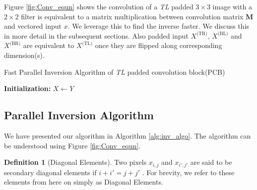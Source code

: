 \documentclass[a4paper,twoside]{article}
\theoremstyle{definition}
\newtheorem{definition}{Definition}
\begin{document}
Figure \ref{fig:Conv_equn} shows the convolution of a \emph{TL} padded $3 \times 3$ image with a $2 \times 2$ filter is equivalent to a matrix multiplication between convolution matrix $\textbf{M}$ and vectored input $x$.  We leverage this to find the inverse faster. We discuss this in more detail in the subsequent sections. Also padded input $X^{\text{(TR)}}$, $X^{\text{(BL)}}$ and $X^{\text{(BR)}}$ are equivalent to $X^{\text{(TL)}}$ once they are flipped along corresponding dimension(s).  



\begin{algorithm}[!t] 
    \caption{Fast Parallel Inversion Algorithm of \emph{TL} padded convolution block(PCB)}
    \label{alg:inv_algo}
    \textbf{Initialization:} $X \gets Y$ \;
\end{algorithm}

\subsection{Parallel Inversion Algorithm}\label{subsec:PIA}
We have presented our algorithm in Algorithm \ref{alg:inv_algo}. The algorithm can be understood using Figure \ref{fig:Conv_equn}. 


\begin{definition}[Diagonal Elements]
Two pixels $x_{i, j}$ and $x_{i', j'}$ are said to be secondary diagonal elements if $i + i' = j+j'$ . For brevity, we refer to these elements from here on simply as Diagonal Elements.
\end{definition}
\end{document}
